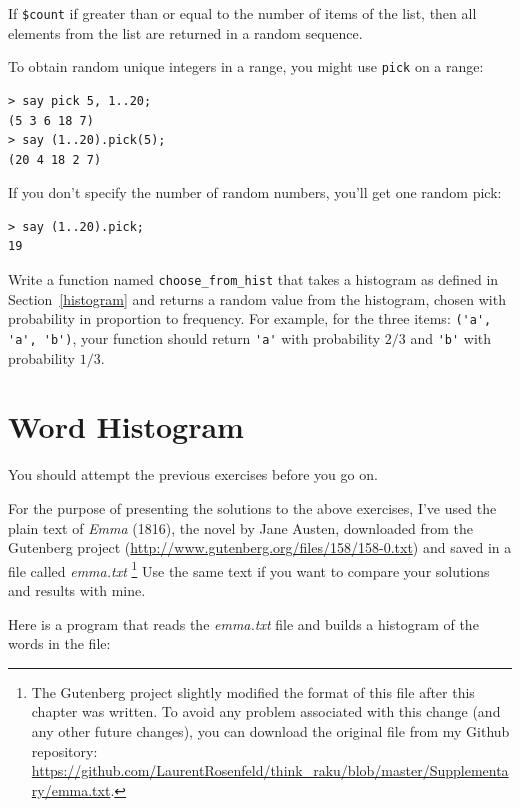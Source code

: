 If \verb'$count' if greater than or equal to the number of 
items of the list, then all elements from the list are returned 
in a random sequence.

To obtain random unique integers in a range, you might use 
{\tt pick} on a range:

\begin{verbatim}
> say pick 5, 1..20;
(5 3 6 18 7)
> say (1..20).pick(5);
(20 4 18 2 7)
\end{verbatim}

If you don't specify the number of random numbers, you'll get one 
random pick:

\begin{verbatim}
> say (1..20).pick;
19
\end{verbatim}
%


\begin{exercise}

Write a function named \verb"choose_from_hist" that takes
a histogram as defined in Section~\ref{histogram} and returns a 
random value from the histogram, chosen with probability
in proportion to frequency.  For example, for the three 
items: \verb"('a', 'a', 'b')", your function should 
return \verb"'a'" with probability $2/3$ and \verb"'b'" 
with probability $1/3$.
\end{exercise}


\section{Word Histogram}

You should attempt the previous exercises before you go on.

For the purpose of presenting the solutions to the above 
exercises, I've used the plain text of {\em Emma} (1816), the 
novel by Jane Austen, downloaded from the Gutenberg project 
(\url{http://www.gutenberg.org/files/158/158-0.txt}) and 
saved in a file called \emph{emma.txt} \footnote{The Gutenberg 
project slightly modified the format of this file after this 
chapter was written. To avoid any problem associated with this 
change (and any other future changes), you can download the 
original file from my Github repository: 
\url{https://github.com/LaurentRosenfeld/think_raku/blob/master/Supplementary/emma.txt}.} Use the same 
text if you want to compare your solutions and results 
with mine.

Here is a program that reads the \emph{emma.txt} file and 
builds a histogram of the words in the file:

